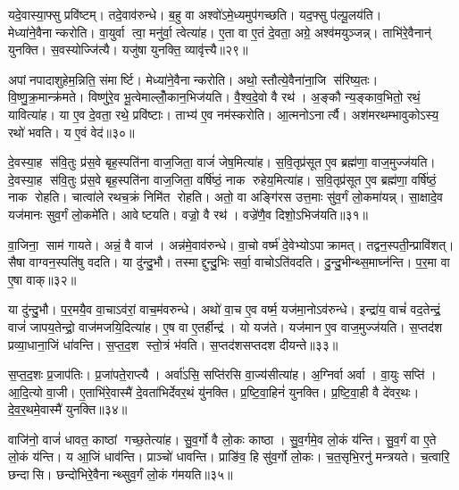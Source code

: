 यदे॒वास्या॒फ्सु प्रवि॑ष्टम्। तदे॒वाव॑रुन्धे। ब॒हु वा अश्वो॑ऽमे॒ध्यमुप॑गच्छति। यद॒फ्सु प॑ल्पू॒लय॑ति। मेध्या॑ने॒वैनान्करोति। वा॒युर्वा त्वा॒ मनु॑र्वा॒ त्वेत्या॑ह। ए॒ता वा ए॒तं दे॒वता॒ अग्रे॒ अश्व॑मयुञ्जन्न्। ताभि॑रे॒वैनान्॑ युनक्ति। स॒वस्योज्जि॑त्यै। यजु॑षा युनक्ति॒ व्यावृ॑त्त्यै॥२९॥

अपांनपादाशुहेम॒न्निति॒ संमार्ष्टि। मेध्या॑ने॒वैनान्करोति। अथो॒ स्तौत्ये॒वैना॑ना॒जि स॑रिष्य॒तः। वि॒ष्णु॒क्र॒मान्क्र॑मते। विष्णु॑रे॒व भू॒त्वेमाल्लोँ॒कान॒भिज॑यति। वै॒श्व॒दे॒वो वै रथ॑। अ॒ङ्कौ न्य॒ङ्काव॒भितो॒ रथं॒ यावित्या॑ह। या ए॒व दे॒वता॒ रथे॒ प्रवि॑ष्टाः। ताभ्य॑ ए॒व नम॑स्करोति। आ॒त्मनोऽनार्त्यै। अश॑मरथम्भावुकोऽस्य॒ रथो॑ भवति। य ए॒वं वेद॑॥३०॥\anuvakamend[स्व॒द॒य॒ति॒ प॒ल्पू॒लय॑ति॒ व्यावृ॑त्त्या॒ अनार्त्यै॒ द्वे च॑]

दे॒वस्या॒ह स॑वि॒तुः प्र॑स॒वे बृह॒स्पति॑ना वाज॒जिता॒ वाजं॑ जेष॒मित्या॑ह। स॒वि॒तृप्र॑सूत ए॒व ब्रह्म॑णा॒ वाज॒मुज्ज॑यति। दे॒वस्या॒ह स॑वि॒तुः प्र॑स॒वे बृह॒स्पति॑ना वाज॒जिता॒ वर्\mbox{}षि॑ष्ठं॒ नाक रुहेय॒मित्या॑ह। स॒वि॒तृप्र॑सूत ए॒व ब्रह्म॑णा॒ वर्\mbox{}षि॑ष्ठं॒ नाक रोहति। चात्वा॑ले रथच॒क्रं निमि॑त रोहति। अतो॒ वा अङ्गि॑रस उत्त॒माः सु॑व॒र्गं लो॒कमा॑यन्न्। सा॒क्षादे॒व यज॑मानः सुव॒र्गं लो॒कमे॑ति। आवेष्टयति। वज्रो॒ वै रथ॑। वज्रे॑णै॒व दिशो॒ऽभिज॑यति॥३१॥

वा॒जिना॒ साम॑ गायते। अन्नं॒ वै वाज॑। अन्न॑मे॒वाव॑रुन्धे। वा॒चो वर्ष्म॑ दे॒वेभ्योऽपाक्रामत्। तद्वन॒स्पती॒न्प्रावि॑शत्। सैषा वाग्वन॒स्पति॑षु वदति। या दु॑न्दु॒भौ। तस्माद्दुन्दु॒भिः सर्वा॒ वाचोऽति॑वदति। दु॒न्दु॒भीन्थ्स॒माघ्न॑न्ति। प॒र॒मा वा ए॒षा वाक्॥३२॥

या दु॑न्दु॒भौ। प॒र॒मयै॒व वा॒चाऽव॑रां॒ वाच॒म॑वरुन्धे। अथो॑ वा॒च ए॒व वर्ष्म॒ यज॑मा॒नोऽव॑रुन्धे। इन्द्रा॑य॒ वाचं॑ वद॒तेन्द्रं॒ वाजं॑ जापय॒तेन्द्रो॒ वाज॑मजयि॒दित्या॑ह। ए॒ष वा ए॒तर्\mbox{}हीन्द्र॑। यो यज॑ते। यज॑मान ए॒व वाज॒मुज्ज॑यति। स॒प्तद॑श प्रव्या॒धाना॒जिं धा॑वन्ति। स॒प्त॒द॒श स्तो॒त्रं भ॑वति। स॒प्तद॑शसप्तदश दीयन्ते॥३३॥

स॒प्त॒द॒शः प्र॒जाप॑तिः। प्र॒जा॑पते॒राप्त्यै। अर्वा॑ऽसि॒ सप्ति॑रसि वा॒ज्य॑सीत्या॑ह। अ॒ग्निर्वा अर्वा। वा॒युः सप्ति॑। आ॒दि॒त्यो वा॒जी। ए॒ताभि॑रे॒वास्मै॑ दे॒वता॑भिर्देवर॒थं यु॑नक्ति। प्र॒ष्टि॒वा॒हिनं॑ युनक्ति। प्र॒ष्टि॒वा॒ही वै दे॑वर॒थः। दे॒व॒र॒थमे॒वास्मै॑ युनक्ति॥३४॥

वाजि॑नो॒ वाजं॑ धावत॒ काष्ठां गच्छ॒तेत्या॑ह। सु॒व॒र्गो वै लो॒कः काष्ठा। सु॒व॒र्गमे॒व लो॒कं य॑न्ति। सु॒व॒र्गं वा ए॒ते लो॒कं य॑न्ति। य आ॒जिं धाव॑न्ति। प्राञ्चो॑ धावन्ति। प्राङि॑व॒ हि सु॑व॒र्गो लो॒कः। च॒त॒सृभि॒रनु॑ मन्त्रयते। च॒त्वारि॒ छन्दासि। छन्दो॑भिरे॒वैनान्थ्सुव॒र्गं लो॒कं ग॑मयति॥३५॥

